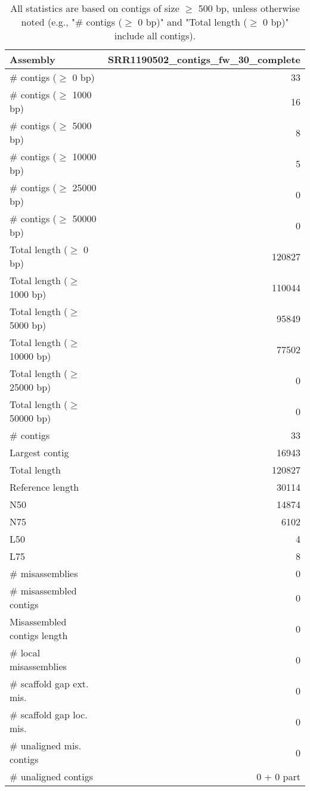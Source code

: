 \documentclass[12pt,a4paper]{article}
\begin{document}
\begin{table}[ht]
\begin{center}
\caption{All statistics are based on contigs of size $\geq$ 500 bp, unless otherwise noted (e.g., "\# contigs ($\geq$ 0 bp)" and "Total length ($\geq$ 0 bp)" include all contigs).}
\begin{tabular}{|l*{1}{|r}|}
\hline
Assembly & SRR1190502\_contigs\_fw\_30\_complete \\ \hline
\# contigs ($\geq$ 0 bp) & 33 \\ \hline
\# contigs ($\geq$ 1000 bp) & 16 \\ \hline
\# contigs ($\geq$ 5000 bp) & 8 \\ \hline
\# contigs ($\geq$ 10000 bp) & 5 \\ \hline
\# contigs ($\geq$ 25000 bp) & 0 \\ \hline
\# contigs ($\geq$ 50000 bp) & 0 \\ \hline
Total length ($\geq$ 0 bp) & 120827 \\ \hline
Total length ($\geq$ 1000 bp) & 110044 \\ \hline
Total length ($\geq$ 5000 bp) & 95849 \\ \hline
Total length ($\geq$ 10000 bp) & 77502 \\ \hline
Total length ($\geq$ 25000 bp) & 0 \\ \hline
Total length ($\geq$ 50000 bp) & 0 \\ \hline
\# contigs & 33 \\ \hline
Largest contig & 16943 \\ \hline
Total length & 120827 \\ \hline
Reference length & 30114 \\ \hline
N50 & 14874 \\ \hline
N75 & 6102 \\ \hline
L50 & 4 \\ \hline
L75 & 8 \\ \hline
\# misassemblies & 0 \\ \hline
\# misassembled contigs & 0 \\ \hline
Misassembled contigs length & 0 \\ \hline
\# local misassemblies & 0 \\ \hline
\# scaffold gap ext. mis. & 0 \\ \hline
\# scaffold gap loc. mis. & 0 \\ \hline
\# unaligned mis. contigs & 0 \\ \hline
\# unaligned contigs & 0 + 0 part \\ \hline

\end{tabular}
\end{center}
\end{table}
\end{document}
